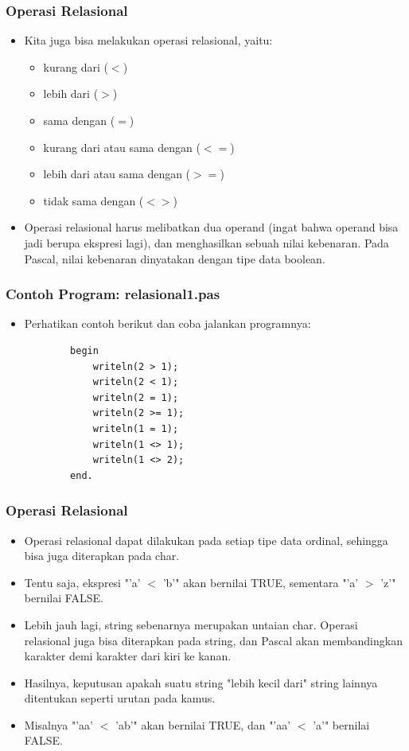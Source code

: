 \documentclass{beamer}
\begin{document}
\begin{frame}
\frametitle{Operasi Relasional}
\begin{itemize}
	\item Kita juga bisa melakukan operasi relasional, yaitu:
	\begin{itemize}
		\item kurang dari ($<$)
		\item lebih dari ($>$)
		\item sama dengan ($=$)
		\item kurang dari atau sama dengan ($<=$)
		\item lebih dari atau sama dengan ($>=$)
		\item tidak sama dengan ($<>$)
	\end{itemize}
	\item Operasi relasional harus melibatkan dua operand (ingat bahwa operand bisa jadi berupa ekspresi lagi), dan menghasilkan sebuah nilai kebenaran. Pada Pascal, nilai kebenaran dinyatakan dengan tipe data \alert{boolean}.
\end{itemize}
\end{frame}

\begin{frame}[fragile]
\frametitle{Contoh Program: relasional1.pas}
\begin{itemize}
	\item Perhatikan contoh berikut dan coba jalankan programnya:
	\begin{lstlisting}
		begin
		    writeln(2 > 1);
		    writeln(2 < 1);
		    writeln(2 = 1);
		    writeln(2 >= 1);
		    writeln(1 = 1);
		    writeln(1 <> 1);
		    writeln(1 <> 2);
		end.
	\end{lstlisting}
\end{itemize}
\end{frame}

\begin{frame}
\frametitle{Operasi Relasional}
\begin{itemize}
	\item Operasi relasional dapat dilakukan pada setiap tipe data ordinal, sehingga bisa juga diterapkan pada char.
	\item Tentu saja, ekspresi "'a' $<$ 'b'" akan bernilai TRUE, sementara "'a' $>$ 'z'" bernilai FALSE.
	\item Lebih jauh lagi, string sebenarnya merupakan untaian char. Operasi relasional juga bisa diterapkan pada string, dan Pascal akan membandingkan karakter demi karakter dari kiri ke kanan. 
	\item Hasilnya, keputusan apakah suatu string "lebih kecil dari" string lainnya ditentukan seperti urutan pada kamus.
	\item Misalnya "'aa' $<$ 'ab'" akan bernilai TRUE, dan "'aa' $<$ 'a'" bernilai FALSE. 
\end{itemize}
\end{frame}
\end{document}
